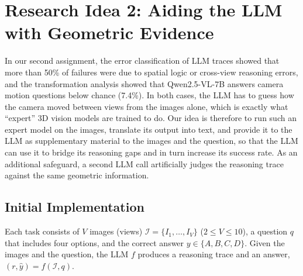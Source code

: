 \section{Research Idea 2: Aiding the LLM with Geometric Evidence}
\label{sec:idea2}

In our second assignment, the error classification of LLM traces showed that more than 50\% of failures were due to spatial logic or cross-view reasoning errors, and the transformation analysis showed that Qwen2.5-VL-7B answers camera motion questions below chance (7.4\%). In both cases, the LLM has to guess how the camera moved between views from the images alone, which is exactly what ``expert'' 3D vision models are trained to do. Our idea is therefore to run such an expert model on the images, translate its output into text, and provide it to the LLM as supplementary material to the images and the question, so that the LLM can use it to bridge its reasoning gaps and in turn increase its success rate. As an additional safeguard, a second LLM call artificially judges the reasoning trace against the same geometric information.

\subsection{Initial Implementation}
\label{sec:idea2-impl}

Each task consists of $V$ images (views) $\mathcal{I}=\{I_1,\dots,I_V\}$ ($2\le V\le 10$), a question $q$ that includes four options, and the correct answer $y\in\{A,B,C,D\}$. Given the images and the question, the LLM $f$ produces a reasoning trace and an answer, $(r,\hat{y})=f(\mathcal{I},q)$.

